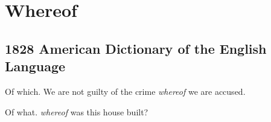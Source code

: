 \section{Whereof}
	\label{WHEREOF}
	

\subsection{1828 American Dictionary of the English Language} %
	\label{WHEREOF-1828}

	\begin{compactitem}
		\item[1] Of which. We are not guilty of the crime \textit{whereof} we are accused.
		\item[2] Of what. \textit{whereof} was this house built?
	\end{compactitem}




	
	
